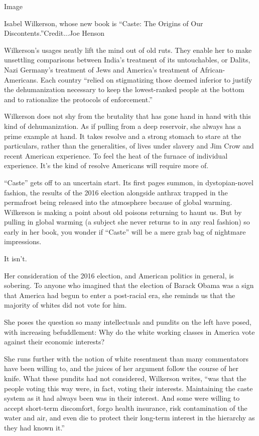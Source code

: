 Image

Isabel Wilkerson, whose new book is ``Caste: The Origins of Our
Discontents.''Credit...Joe Henson

Wilkerson's usages neatly lift the mind out of old ruts. They enable her
to make unsettling comparisons between India's treatment of its
untouchables, or Dalits, Nazi Germany's treatment of Jews and America's
treatment of African-Americans. Each country ``relied on stigmatizing
those deemed inferior to justify the dehumanization necessary to keep
the lowest-ranked people at the bottom and to rationalize the protocols
of enforcement.''

Wilkerson does not shy from the brutality that has gone hand in hand
with this kind of dehumanization. As if pulling from a deep reservoir,
she always has a prime example at hand. It takes resolve and a strong
stomach to stare at the particulars, rather than the generalities, of
lives under slavery and Jim Crow and recent American experience. To feel
the heat of the furnace of individual experience. It's the kind of
resolve Americans will require more of.

``Caste'' gets off to an uncertain start. Its first pages summon, in
dystopian-novel fashion, the results of the 2016 election alongside
anthrax trapped in the permafrost being released into the atmosphere
because of global warming. Wilkerson is making a point about old poisons
returning to haunt us. But by pulling in global warming (a subject she
never returns to in any real fashion) so early in her book, you wonder
if ``Caste'' will be a mere grab bag of nightmare impressions.

It isn't.

Her consideration of the 2016 election, and American politics in
general, is sobering. To anyone who imagined that the election of Barack
Obama was a sign that America had begun to enter a post-racial era, she
reminds us that the majority of whites did not vote for him.

She poses the question so many intellectuals and pundits on the left
have posed, with increasing befuddlement: Why do the white working
classes in America vote against their economic interests?

She runs further with the notion of white resentment than many
commentators have been willing to, and the juices of her argument follow
the course of her knife. What these pundits had not considered,
Wilkerson writes, ``was that the people voting this way were, in fact,
voting their interests. Maintaining the caste system as it had always
been was in their interest. And some were willing to accept short-term
discomfort, forgo health insurance, risk contamination of the water and
air, and even die to protect their long-term interest in the hierarchy
as they had known it.''

